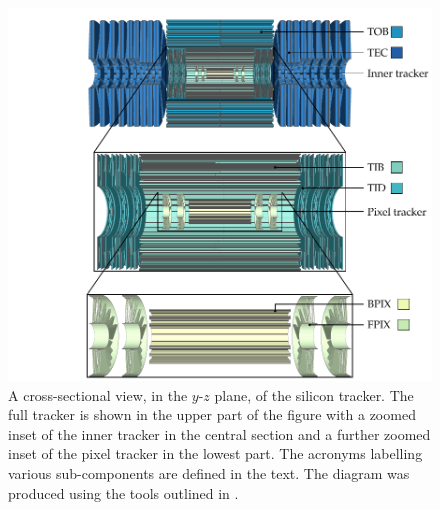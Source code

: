 \begin{figure}[htb]
    \centering
    \includegraphics[]{diagrams/tikz/cms/annotated/cms_tracker.pdf}
    \caption[Cross-section view of the silicon tracker.]{
        A cross-sectional view, in the $y$-$z$ plane, of the silicon tracker.
        The full tracker is shown in the upper part of the figure with a
        zoomed inset of the inner tracker in the central section and a further
        zoomed inset of the pixel tracker in the lowest part. The acronyms
        labelling various sub-components are defined in the text. The diagram
        was produced using the tools outlined in \cite{Sakuma:2013jqa}.
    }
    \label{fig:cms-tracker}
\end{figure}

